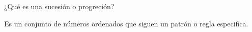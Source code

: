 
\question ¿Qué es una sucesión o progreción?
  \begin{solution}[2cm]
    Es un conjunto de números ordenados que siguen un patrón o regla
    especifica.
  \end{solution}
